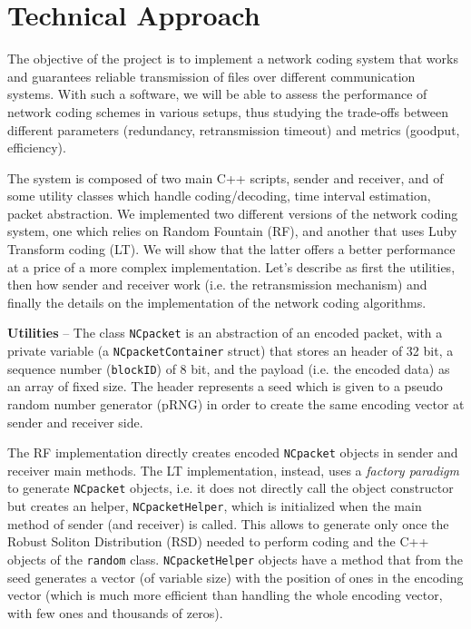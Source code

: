\section{Technical Approach}\label{sec:impl}
\setlength{\abovecaptionskip}{10pt plus 3pt minus 2pt}

The objective of the project is to implement a network coding system that works and guarantees reliable transmission of files over different communication systems. With such a software, we will be able to assess the performance of network coding schemes in various setups, thus studying the trade-offs between different parameters (redundancy, retransmission timeout) and metrics (goodput, efficiency).

The system is composed of two main C++ scripts, sender and receiver, and of some utility classes which handle coding/decoding, time interval estimation, packet abstraction. We implemented two different versions of the network coding system, one which relies on Random Fountain (RF), and another that uses Luby Transform coding (LT). We will show that the latter offers a better performance at a price of a more complex implementation. Let's describe as first the utilities, then how sender and receiver work (i.e. the retransmission mechanism) and finally the details on the implementation of the network coding algorithms.

\textbf{Utilities} -- The class \texttt{NCpacket} is an abstraction of an encoded packet, with a private variable (a \newline \texttt{NCpacketContainer} struct) that stores an header of 32 bit, a sequence number (\texttt{blockID}) of 8 bit, and the payload (i.e. the encoded data) as an array of fixed size. 
The header represents a seed which is given to a pseudo random number generator (pRNG) in order to create the same encoding vector at sender and receiver side. 

The RF implementation directly creates encoded \texttt{NCpacket} objects in sender and receiver main methods.
The LT implementation, instead, uses a \textit{factory paradigm} to generate \texttt{NCpacket} objects, i.e. it does not directly call the object constructor but creates an helper, \texttt{NCpacketHelper}, which is initialized when the main method of sender (and receiver) is called. This allows to generate only once the Robust Soliton Distribution (RSD) needed to perform coding and the C++ objects of the \texttt{random} class. \texttt{NCpacketHelper} objects have a method that from the seed generates a vector (of variable size) with the position of ones in the encoding vector (which is much more efficient than handling the whole encoding vector, with few ones and thousands of zeros).

